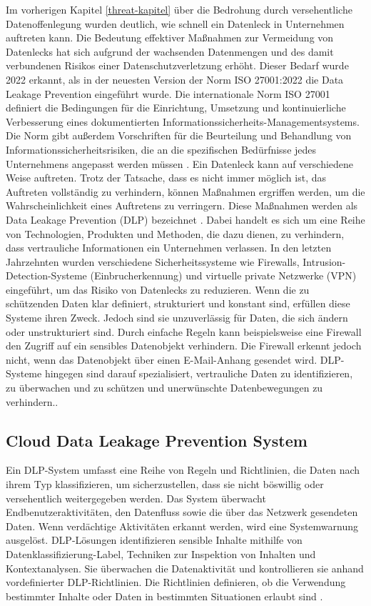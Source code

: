 Im vorherigen Kapitel \ref{threat-kapitel} über die Bedrohung durch versehentliche Datenoffenlegung wurden deutlich, wie schnell ein Datenleck in Unternehmen auftreten kann. Die Bedeutung effektiver Maßnahmen zur Vermeidung von Datenlecks hat sich aufgrund der wachsenden Datenmengen und des damit verbundenen Risikos einer Datenschutzverletzung erhöht. Dieser Bedarf wurde 2022 erkannt, als in der neuesten Version der Norm ISO 27001:2022 die Data Leakage Prevention eingeführt wurde. Die internationale Norm ISO 27001 definiert die Bedingungen für die Einrichtung, Umsetzung und kontinuierliche Verbesserung eines dokumentierten Informationssicherheits-Managementsystems. Die Norm gibt außerdem Vorschriften für die Beurteilung und Behandlung von Informationssicherheitsrisiken, die an die spezifischen Bedürfnisse jedes Unternehmens angepasst werden müssen \cite{Monev.2023}.
Ein Datenleck kann auf verschiedene Weise auftreten. Trotz der Tatsache, dass es nicht immer möglich ist, das Auftreten vollständig zu verhindern, können Maßnahmen ergriffen werden, um die Wahrscheinlichkeit eines Auftretens zu verringern. Diese Maßnahmen werden als Data Leakage Prevention (DLP) bezeichnet \cite{Monev.2023}. Dabei handelt es sich um eine Reihe von Technologien, Produkten und Methoden, die dazu dienen, zu verhindern, dass vertrauliche Informationen ein Unternehmen verlassen. In den letzten Jahrzehnten wurden verschiedene Sicherheitssysteme wie Firewalls, Intrusion-Detection-Systeme (Einbrucherkennung) und virtuelle private Netzwerke (VPN) eingeführt, um das Risiko von Datenlecks zu reduzieren. Wenn die zu schützenden Daten klar definiert, strukturiert und konstant sind, erfüllen diese Systeme ihren Zweck. Jedoch sind sie unzuverlässig für Daten, die sich ändern oder unstrukturiert sind. Durch einfache Regeln kann beispielsweise eine Firewall den Zugriff auf ein sensibles Datenobjekt verhindern. Die Firewall erkennt jedoch nicht, wenn das Datenobjekt über einen E-Mail-Anhang gesendet wird. DLP-Systeme hingegen sind darauf spezialisiert, vertrauliche Daten zu identifizieren, zu überwachen und zu schützen und unerwünschte Datenbewegungen zu verhindern.\cite{Alneyadi.2016}.

\subsection{Cloud Data Leakage Prevention System}
Ein DLP-System umfasst eine Reihe von Regeln und Richtlinien, die Daten nach ihrem Typ klassifizieren, um sicherzustellen, dass sie nicht böswillig oder versehentlich weitergegeben werden. Das System überwacht Endbenutzeraktivitäten, den Datenfluss sowie die über das Netzwerk gesendeten Daten. Wenn verdächtige Aktivitäten erkannt werden, wird eine Systemwarnung ausgelöst. DLP-Lösungen identifizieren sensible Inhalte mithilfe von Datenklassifizierung-Label, Techniken zur Inspektion von Inhalten und Kontextanalysen. Sie überwachen die Datenaktivität und kontrollieren sie anhand vordefinierter DLP-Richtlinien. Die Richtlinien definieren, ob die Verwendung bestimmter Inhalte oder Daten in bestimmten Situationen erlaubt sind \cite{Chugh.2023}.

